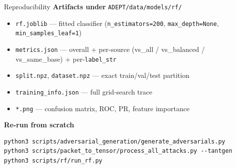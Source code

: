 \documentclass[10pt,aspectratio=169]{beamer}
\begin{document}
\begin{frame}[fragile]{Reproducibility}
\textbf{Artifacts under} \texttt{ADEPT/data/models/rf/}
\begin{itemize}\small
  \item \texttt{rf.joblib} --- fitted classifier
        (\texttt{n\_estimators=200}, \texttt{max\_depth=None}, \texttt{min\_samples\_leaf=1})
  \item \texttt{metrics.json} --- overall + per-source (vs\_all / vs\_balanced /
        vs\_same\_base) + per-\texttt{label\_str}
  \item \texttt{split.npz}, \texttt{dataset.npz} --- exact train/val/test partition
  \item \texttt{training\_info.json} --- full grid-search trace
  \item \texttt{*.png} --- confusion matrix, ROC, PR, feature importance
\end{itemize}

\vspace{0.6em}
\textbf{Re-run from scratch}
\begin{block}{}
\small
\begin{verbatim}
python3 scripts/adversarial_generation/generate_adversarials.py
python3 scripts/packet_to_tensor/process_all_attacks.py --tantgen
python3 scripts/rf/run_rf.py
\end{verbatim}
\end{block}
\end{frame}
\end{document}
